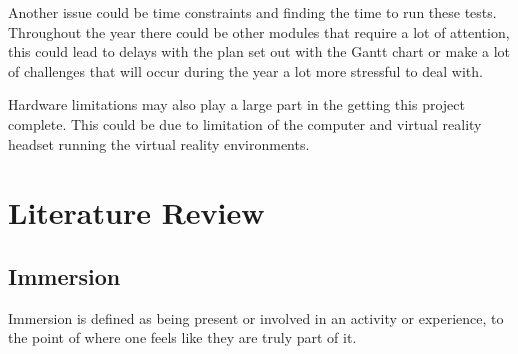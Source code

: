 Another issue could be time constraints and finding the time to run these tests. Throughout the year there could be other modules that require a lot of attention, this could lead to delays with the plan set out with the Gantt chart or make a lot of challenges that will occur during the year a lot more stressful to deal with. 

Hardware limitations may also play a large part in the getting this project complete. This could be due to limitation of the computer and virtual reality headset running the virtual reality environments. 


\chapter{Literature Review}

\section{Immersion}
Immersion is defined as being present or involved in an activity or experience, to the point of where one feels like they are truly part of it.  

